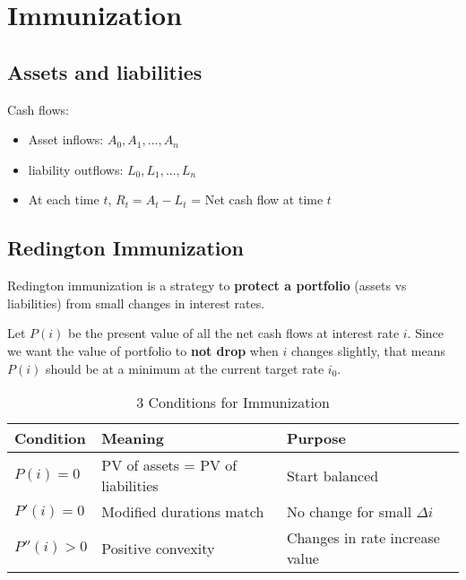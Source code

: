 \chapter{Immunization}

\section{Assets and liabilities}

\begin{comments}
Cash flows: 
    \begin{itemize}
        \item Asset inflows: $A_0, A_1, ... , A_n$
        \item liability outflows: $L_0, L_1, ... , L_n$
        \item At each time $t$, $R_t = A_t - L_t$ = Net cash flow at time $t$
    \end{itemize} 
\end{comments}


















\section{Redington Immunization}

\begin{definition}
    Redington immunization is a strategy to \textbf{protect a portfolio} (assets vs liabilities) 
    from small changes in interest rates. 
\end{definition}


\begin{comments}

    Let $P(i)$ be the present value of all the net cash flows at interest rate $i$. Since we 
    want the value of portfolio to \textbf{not drop} when $i$ changes slightly, that means 
    $P(i)$ should be at a minimum at the current target rate $i_0$. 
\begin{table}[htbp]
\centering
\caption{3 Conditions for Immunization}
\begin{tabular}{lll}
\toprule
\textbf{Condition} & \textbf{Meaning} & \textbf{Purpose} \\
\midrule
$P(i) = 0$ & PV of assets = PV of liabilities & Start balanced \\
$P'(i) = 0$ & Modified durations match & No change for small $\Delta i$ \\
$P''(i) > 0$ & Positive convexity & Changes in rate increase value \\
\bottomrule
\end{tabular}
\end{table}


\end{comments}


